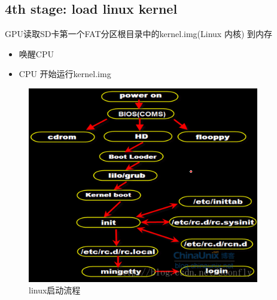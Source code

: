\subsection{4th stage: load linux kernel}
GPU读取SD卡第一个FAT分区根目录中的kernel.img(Linux 内核) 到内存
\begin{itemize}
    \item 唤醒CPU
    \item CPU 开始运行kernel.img
\end{itemize}
\begin{figure}[htpb]
    \centering
    \includegraphics[width=0.9\textwidth]{pictures/raspberry_startup.png}
    \caption{linux启动流程}
    \label{rasp:startup}
\end{figure}
